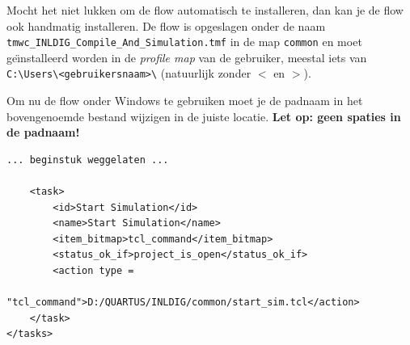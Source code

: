 \documentclass[a4paper,12pt,fleqn,twoside]{book}
\begin{document}
Mocht het niet lukken om de flow automatisch te installeren, dan kan je de
flow ook handmatig installeren.
De flow is opgeslagen onder de naam
\lstinline|tmwc_INLDIG_Compile_And_Simulation.tmf| in de map \lstinline|common|
en moet ge\"{\i}nstalleerd worden in de \textsl{profile map} van de gebruiker,
meestal iets van\\ \lstinline|C:\Users\<gebruikersnaam>\| (natuurlijk zonder
$<$ en $>$).

Om nu de flow onder Windows te gebruiken moet je de padnaam in het bovengenoemde
bestand wijzigen in de juiste locatie.
\textbf{Let op: geen spaties in de padnaam!}

\begin{lstlisting}[numbers=none]
... beginstuk weggelaten ...

    <task> 
        <id>Start Simulation</id> 
        <name>Start Simulation</name> 
        <item_bitmap>tcl_command</item_bitmap> 
        <status_ok_if>project_is_open</status_ok_if> 
        <action type =
            "tcl_command">D:/QUARTUS/INLDIG/common/start_sim.tcl</action> 
    </task> 
</tasks> 
\end{lstlisting}
\end{document}
